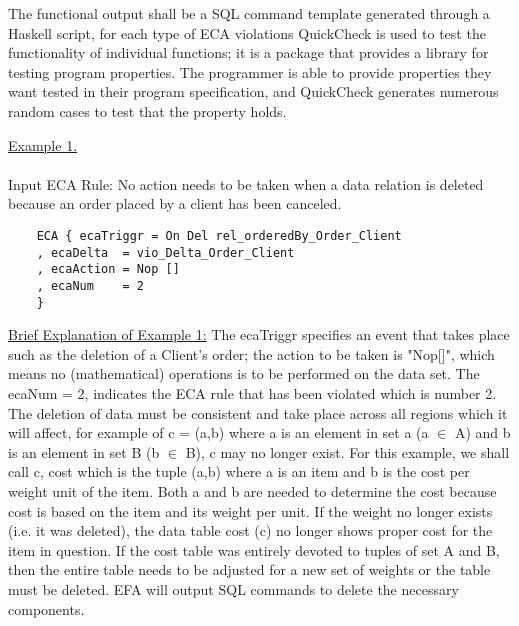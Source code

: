 \documentclass[12pt]{report}
\begin{document}
{The functional output shall be a SQL command template generated through a 
Haskell script, for each type of ECA violations}
{QuickCheck  is used to test the functionality of individual functions; it is a 
package that provides a library for testing program properties. The programmer 
is able to provide properties they want tested in their program specification, 
and QuickCheck generates numerous random cases to test that the property 
holds\cite{hackage}. }

\underline{Example 1.}
\paragraph{}
Input ECA Rule: No action needs to be taken when a data relation is 
deleted because 
an order placed by a client has been canceled.
	\begin{verbatim}
	ECA { ecaTriggr = On Del rel_orderedBy_Order_Client
	, ecaDelta  = vio_Delta_Order_Client
	, ecaAction = Nop []
	, ecaNum    = 2
	} 
	\end{verbatim} 	
\underline{Brief Explanation of Example 1:} \newline \newline \indent
The ecaTriggr specifies an event that takes place such as the deletion of a 
Client's order; the action to be taken is "Nop[]", which means no 
(mathematical) operations is to be performed on the data set. The ecaNum = 2, 
indicates the ECA rule that has been violated which is number 2. The deletion 
of data must be consistent and take place across all regions which it will 
affect, for example of c = (a,b) where a is an element in set a (a $\in$ A) and 
b is an element in set B (b $\in$ B), c may no longer exist. For this example, 
we shall call c, cost which is the tuple (a,b) where a is an item and b is the 
cost per weight unit of the item. Both a and b are needed to determine the cost 
because cost is based on the item and its weight per unit. If the weight no 
longer exists (i.e. it was deleted), the data table cost (c) no longer shows 
proper cost for the item in question. If the cost table was entirely devoted to 
tuples of set A and B, then the entire table needs to be adjusted for a new set 
of weights or the table must be deleted. EFA will output SQL commands to delete 
the necessary components.
\end{document}
